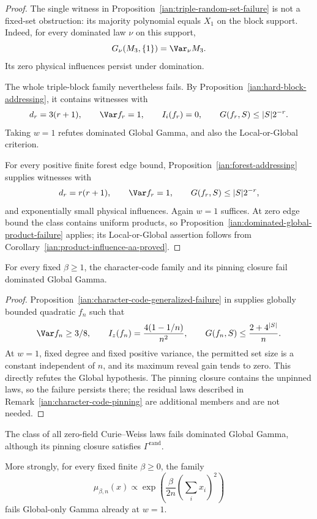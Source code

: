 \begin{proof}
The single witness in
Proposition~\ref{ian:triple-random-set-failure} is not a fixed-set
obstruction: its majority polynomial equals \(X_1\) on the block
support. Indeed, for every dominated law \(\nu\) on this support,
\[
 G_\nu(M_3,\{1\})=\Var_\nu M_3.
\]
Its zero physical influences persist under domination.

The whole triple-block family nevertheless fails. By
Proposition~\ref{ian:hard-block-addressing}, it contains witnesses
with
\[
 d_r=3(r+1),\qquad \Var f_r=1,\qquad I_i(f_r)=0,
 \qquad G(f_r,S)\le |S|2^{-r}.
\]
Taking \(w=1\) refutes dominated Global Gamma, and also the
Local-or-Global criterion.

For every positive finite forest edge bound,
Proposition~\ref{ian:forest-addressing} supplies witnesses with
\[
 d_r=r(r+1),\qquad \Var f_r=1,\qquad
 G(f_r,S)\le|S|2^{-r},
\]
and exponentially small physical influences. Again \(w=1\)
suffices. At zero edge bound the class contains uniform products,
so Proposition~\ref{ian:dominated-global-product-failure} applies;
its Local-or-Global assertion follows from
Corollary~\ref{ian:product-influence-aa-proved}.
\end{proof}

\begin{proposition}
\label{ian:dominated-global-character-failure}
For every fixed \(\beta\ge1\), the character-code family and its
pinning closure fail dominated Global Gamma.
\end{proposition}

\begin{proof}
Proposition~\ref{ian:character-code-generalized-failure} in
 supplies globally
bounded quadratic \(f_n\) such that
\[
 \Var f_n\ge3/8,\qquad
 I_z(f_n)=\frac{4(1-1/n)}{n^2},
 \qquad
 G(f_n,S)\le\frac{2+4^{|S|}}n.
\]
At \(w=1\), fixed degree and fixed positive variance, the permitted
set size is a constant independent of \(n\), and its maximum reveal
gain tends to zero. This directly refutes the Global hypothesis.
The pinning closure contains the unpinned laws, so the failure
persists there; the residual laws described in
Remark~\ref{ian:character-code-pinning} are additional members and are
not needed.
\end{proof}

\begin{proposition}
\label{ian:dominated-global-curie-weiss-failure}
The class of all zero-field Curie--Weiss laws fails dominated
Global Gamma, although its pinning closure satisfies
\(\Gamma^{\mathrm{rand}}\).

More strongly, for every fixed finite \(\beta\ge0\), the family
\[
 \mu_{\beta,n}(x)\propto
 \exp\left(\frac{\beta}{2n}\left(\sum_i x_i\right)^2\right)
\]
fails Global-only Gamma already at \(w=1\).
\end{proposition}

